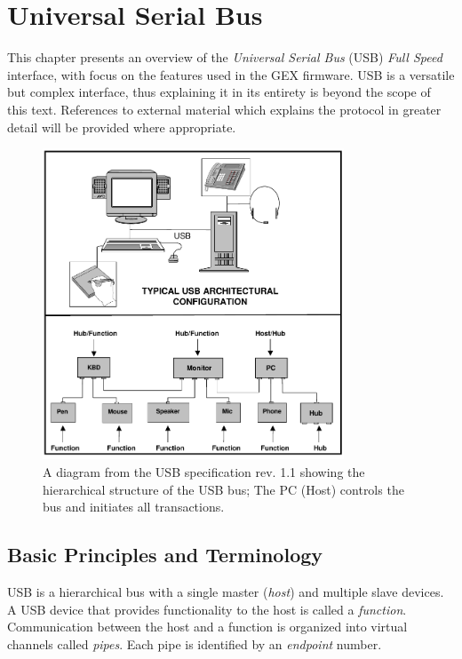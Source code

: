 \chapter{Universal Serial Bus}

This chapter presents an overview of the \textit{Universal Serial Bus} (USB) \textit{Full Speed} interface, with focus on the features used in the GEX firmware. USB is a versatile but complex interface, thus explaining it in its entirety is beyond the scope of this text. References to external material which explains the protocol in greater detail will be provided where appropriate.

\begin{figure}[H]
	\centering
	\includegraphics[width=0.8\textwidth] {img/usb-hierarchy.png}
	\caption[USB hierarchical structure]{\label{fig:usb-hierarchy}A diagram from the USB specification rev. 1.1 showing the hierarchical structure of the USB bus; The PC (Host) controls the bus and initiates all transactions.}
\end{figure}

\section{Basic Principles and Terminology}


USB is a hierarchical bus with a single master (\textit{host}) and multiple slave devices. A USB device that provides functionality to the host is called a \textit{function}. Communication between the host and a function is organized into virtual channels called \textit{pipes}. Each pipe is identified by an \textit{endpoint} number.

